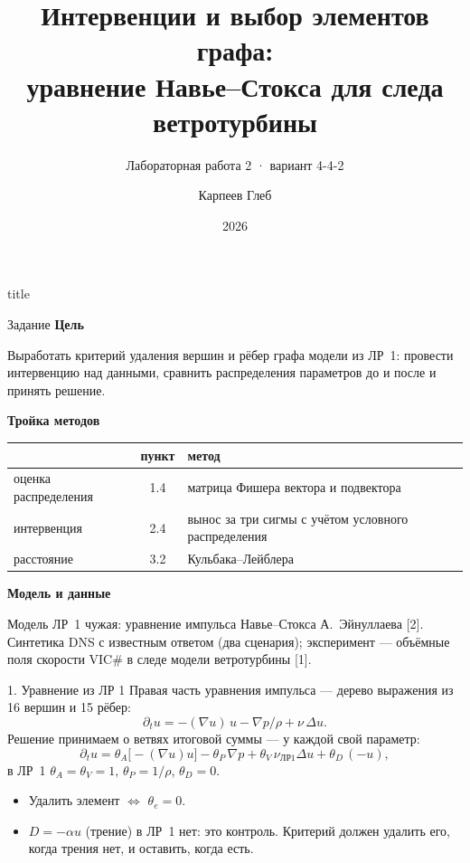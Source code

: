 \documentclass[11pt,aspectratio=43]{beamer}
\title{Интервенции и выбор элементов графа:\\ уравнение Навье–Стокса для следа ветротурбины}
\subtitle{Лабораторная работа 2 · вариант 4-4-2}
\author{Карпеев Глеб}
\date{2026}
\newcommand{\head}[1]{\textbf{#1}\par}
\begin{document}
\begin{frame}[plain]
  \vspace*{-0.4em}
  \begin{beamercolorbox}[wd=\textwidth,sep=0.9em,center]{title}
    {\large\inserttitle}\par\vspace{0.4em}
    {\color{black}\normalsize\insertsubtitle}
  \end{beamercolorbox}
  \vspace{2.2em}
  \centering
  \insertauthor\par\vspace{2.5em}
  \insertdate
\end{frame}

\begin{frame}{Задание}
  \head{Цель}
  Выработать критерий удаления вершин и рёбер графа модели из ЛР~1: провести интервенцию над данными,
  сравнить распределения параметров до и после и принять решение.
  \bigskip

  \head{Тройка методов}
  \small
  \begin{tabular}{@{}lc>{\raggedright\arraybackslash}p{}@{}}
    \toprule
    & пункт & метод \\
    \midrule
    оценка распределения & 1.4 & матрица Фишера вектора и подвектора \\
    интервенция & 2.4 & вынос за три сигмы с учётом условного распределения \\
    расстояние & 3.2 & Кульбака–Лейблера \\
    \bottomrule
  \end{tabular}
  \bigskip

  \head{Модель и данные}
  Модель ЛР~1 чужая: уравнение импульса Навье–Стокса А.~Эйнуллаева [2].
  Синтетика DNS с известным ответом (два сценария); эксперимент — объёмные поля скорости VIC\#
  в следе модели ветротурбины [1].
\end{frame}

\begin{frame}{1. Уравнение из ЛР 1}
  Правая часть уравнения импульса — дерево выражения из 16 вершин и 15 рёбер:
  \[
    \partial_t u=-(\nabla u)\,u-\nabla p/\rho+\nu\,\Delta u .
  \]
  Решение принимаем о ветвях итоговой суммы — у каждой свой параметр:
  \[
    \partial_t u=\theta_A\bigl[-(\nabla u)u\bigr]-\theta_P\,\nabla p+\theta_V\,\nu_{\text{ЛР1}}\Delta u+\theta_D\,(-u),
  \]
  в ЛР~1 $\theta_A=\theta_V=1$, $\theta_P=1/\rho$, $\theta_D=0$.
  \bigskip

  \begin{itemize}
    \item Удалить элемент $\Leftrightarrow$ $\theta_e=0$.
    \item $D=-\alpha u$ (трение) в ЛР~1 нет: это контроль. Критерий должен удалить его, когда трения нет,
      и оставить, когда есть.
  \end{itemize}
\end{frame}
\end{document}
